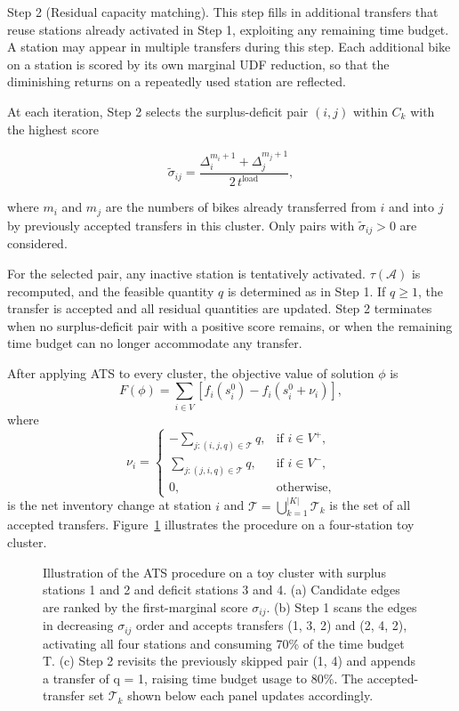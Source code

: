 Step 2 (Residual capacity matching). This step fills in additional transfers that reuse stations already activated in Step 1, exploiting any remaining time budget. A station may appear in multiple transfers during this step. Each additional bike on a station is scored by its own marginal UDF reduction, so that the diminishing returns on a repeatedly used station are reflected.

At each iteration, Step 2 selects the surplus-deficit pair $(i,j)$ within ${{C}_{k}}$ with the highest score

\begin{equation}
{{\tilde{\sigma }}_{ij}}=\frac{\Delta _{i}^{{{m}_{i}}+1}+\Delta _{j}^{{{m}_{j}}+1}}{2\,{{t}^{\text{load}}}},
\end{equation}

where ${{m}_{i}}$ and ${{m}_{j}}$ are the numbers of bikes already transferred from $i$ and into $j$ by previously accepted transfers in this cluster. Only pairs with ${{\tilde{\sigma }}_{ij}}>0$ are considered.

For the selected pair, any inactive station is tentatively activated. $\tau \left( \mathcal{A} \right)$ is recomputed, and the feasible quantity $q$ is determined as in Step 1. If $q\ge 1$, the transfer is accepted and all residual quantities are updated. Step 2 terminates when no surplus-deficit pair with a positive score remains, or when the remaining time budget can no longer accommodate any transfer.

After applying ATS to every cluster, the objective value of solution $\phi$ is
\begin{equation}
F(\phi)=\sum_{i\in V}\left[f_i(s_i^0)-f_i(s_i^0+\nu_i)\right],
\end{equation}
where
\begin{equation}
\nu_i=\begin{cases}
-\sum_{j:(i,j,q)\in\mathcal{T}} q, & \text{if } i\in V^{+},\\
\sum_{j:(j,i,q)\in\mathcal{T}} q, & \text{if } i\in V^{-},\\
0, & \text{otherwise},
\end{cases}
\end{equation}
is the net inventory change at station $i$ and $\mathcal{T}=\bigcup_{k=1}^{|K|}\mathcal{T}_k$ is the set of all accepted transfers. Figure~\ref{ch3:fig:ats-toy} illustrates the procedure on a four-station toy cluster.

\begin{figure}[htbp]
\centering
{}
\caption{Illustration of the ATS procedure on a toy cluster with surplus stations 1 and 2 and deficit stations 3 and 4. (a) Candidate edges are ranked by the first-marginal score $\sigma_{ij}$. (b) Step 1 scans the edges in decreasing $\sigma_{ij}$ order and accepts transfers (1, 3, 2) and (2, 4, 2), activating all four stations and consuming 70\% of the time budget T. (c) Step 2 revisits the previously skipped pair (1, 4) and appends a transfer of q = 1, raising time budget usage to 80\%. The accepted-transfer set $\mathcal{T}_k$ shown below each panel updates accordingly.}
\label{ch3:fig:ats-toy}
\end{figure}

